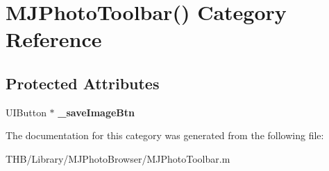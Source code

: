\hypertarget{category_m_j_photo_toolbar_07_08}{}\section{M\+J\+Photo\+Toolbar() Category Reference}
\label{category_m_j_photo_toolbar_07_08}
\subsection*{Protected Attributes}
\begin{DoxyCompactItemize}
\item 
\mbox{\label{category_m_j_photo_toolbar_07_08_aa6e4c50312623f26b16e5c4ac4b971bd}} 
U\+I\+Button $\ast$ {\bfseries \+\_\+save\+Image\+Btn}
\end{DoxyCompactItemize}


The documentation for this category was generated from the following file\+:\begin{DoxyCompactItemize}
\item 
T\+H\+B/\+Library/\+M\+J\+Photo\+Browser/M\+J\+Photo\+Toolbar.\+m\end{DoxyCompactItemize}
